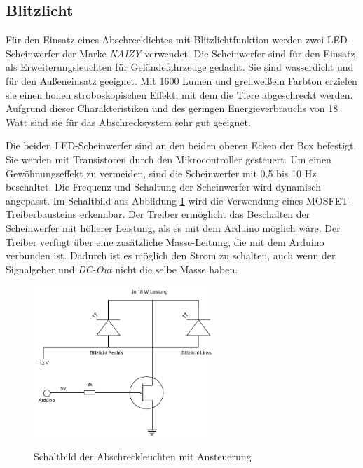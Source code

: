 \subsection{Blitzlicht}

Für den Einsatz eines Abschrecklichtes mit Blitzlichtfunktion werden zwei LED-Scheinwerfer der Marke \textit{NAIZY} verwendet. Die Scheinwerfer sind für den Einsatz als Erweiterungsleuchten für Geländefahrzeuge gedacht. Sie sind wasserdicht und für den Außeneinsatz geeignet. Mit 1600 Lumen und grellweißem Farbton erzielen sie einen hohen stroboskopischen Effekt, mit dem die Tiere abgeschreckt werden. Aufgrund dieser Charakteristiken und des geringen Energieverbrauchs von 18 Watt sind sie für das Abschrecksystem sehr gut geeignet. \cite{am_licht}

Die beiden LED-Scheinwerfer sind an den beiden oberen Ecken der Box befestigt. Sie werden mit Transistoren durch den Mikrocontroller gesteuert. Um einen Gewöhnungseffekt zu vermeiden, sind die Scheinwerfer mit 0,5 bis 10 Hz beschaltet. Die Frequenz und Schaltung der Scheinwerfer wird dynamisch angepasst. Im Schaltbild aus Abbildung \ref{diag:lights_diagram} wird die Verwendung eines MOSFET-Treiberbausteins erkennbar. Der Treiber ermöglicht das Beschalten der Scheinwerfer mit höherer Leistung, als es mit dem Arduino möglich wäre. Der Treiber verfügt über eine zusätzliche Masse-Leitung, die mit dem Arduino verbunden ist. Dadurch ist es möglich den Strom zu schalten, auch wenn der Signalgeber und \textit{DC-Out} nicht die selbe Masse haben. \cite{mosfets_am}

\begin{figure}[h]
    \centering
    \includegraphics[width=0.6\textwidth]{images/lights_diagramm.pdf}
    \label{diag:lights_diagram}
    \caption{Schaltbild der Abschreckleuchten mit Ansteuerung}
\end{figure}

